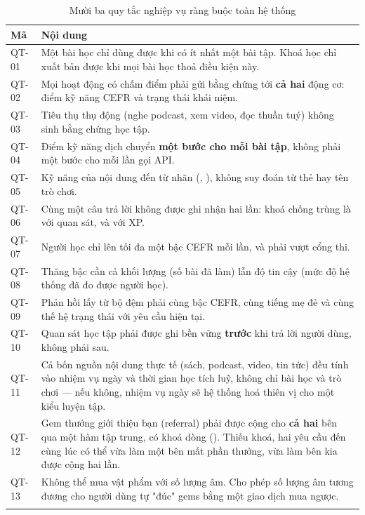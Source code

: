 \begin{longtable}{L{1.3cm} L{12.3cm}}
\toprule
\textbf{Mã} & \textbf{Nội dung}\\
\midrule
\endhead
QT-01 & Một bài học chỉ dùng được khi có ít nhất một bài tập. Khoá học chỉ xuất bản được khi mọi bài học thoả điều kiện này.\\
QT-02 & Mọi hoạt động có chấm điểm phải gửi bằng chứng tới \textbf{cả hai} động cơ: điểm kỹ năng CEFR và trạng thái khái niệm.\\
QT-03 & Tiêu thụ thụ động (nghe podcast, xem video, đọc thuần tuý) không sinh bằng chứng học tập.\\
QT-04 & Điểm kỹ năng dịch chuyển \textbf{một bước cho mỗi bài tập}, không phải một bước cho mỗi lần gọi API.\\
QT-05 & Kỹ năng của nội dung đến từ nhãn (, ), không suy đoán từ thẻ hay tên trò chơi.\\
QT-06 & Cùng một câu trả lời không được ghi nhận hai lần: khoá chống trùng là  với quan sát, và  với XP.\\
QT-07 & Người học chỉ lên tối đa một bậc CEFR mỗi lần, và phải vượt cổng thi.\\
QT-08 & Thăng bậc cần cả khối lượng (số bài đã làm) lẫn độ tin cậy (mức độ hệ thống đã đo được người học).\\
QT-09 & Phản hồi lấy từ bộ đệm phải cùng bậc CEFR, cùng tiếng mẹ đẻ và cùng thế hệ trạng thái với yêu cầu hiện tại.\\
QT-10 & Quan sát học tập phải được ghi bền vững \textbf{trước} khi trả lời người dùng, không phải sau.\\
QT-11 & Cả bốn nguồn nội dung thực tế (sách, podcast, video, tin tức) đều tính vào nhiệm vụ ngày và thời gian học tích luỹ, không chỉ bài học và trò chơi — nếu không, nhiệm vụ ngày sẽ hệ thống hoá thiên vị cho một kiểu luyện tập.\\
QT-12 & Gem thưởng giới thiệu bạn (referral) phải được cộng cho \textbf{cả hai} bên qua một hàm tập trung, có khoá dòng (). Thiếu khoá, hai yêu cầu đến cùng lúc có thể vừa làm một bên mất phần thưởng, vừa làm bên kia được cộng hai lần.\\
QT-13 & Không thể mua vật phẩm với số lượng âm. Cho phép số lượng âm tương đương cho người dùng tự "đúc" gems bằng một giao dịch mua ngược.\\
\bottomrule
\caption{Mười ba quy tắc nghiệp vụ ràng buộc toàn hệ thống}
\end{longtable}


